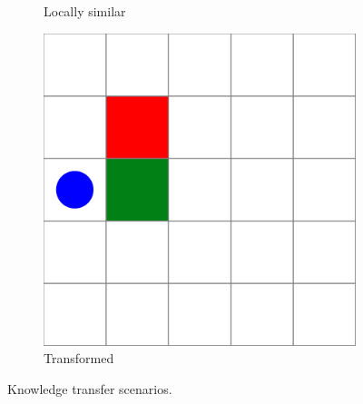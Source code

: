 \begin{figure}
\begin{subfigure}[t]{0.25\linewidth}
        \caption{\scriptsize Locally similar}  
        \label{fig:motivation_a2t}
    \end{subfigure}
    \hfill
    \begin{subfigure}[t]{0.25\linewidth}   
        \centering 
        \includegraphics[width=\textwidth]{figures/iterative_validation/gridworld4.pdf}
        \caption{\scriptsize Transformed}
        \label{fig:motivation_sat}
    \end{subfigure}
    \caption{Knowledge transfer scenarios.}
    \label{fig:motivation}
\end{figure}

\vspace{-0.1 in}
